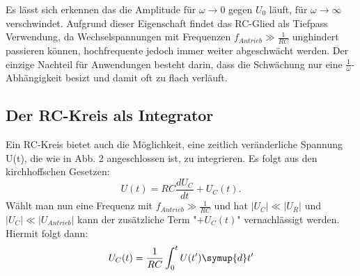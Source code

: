 Es lässt sich erkennen das die Amplitude für $\omega \to 0$ gegen $U_0$ läuft, für
$\omega \to \infty$ verschwindet. Aufgrund dieser Eigenschaft findet das RC-Glied als
 Tiefpass Verwendung, da Wechselspannungen mit Frequenzen $f_{Antrieb} \gg \frac{1}{RC}$
  unghindert passieren können, hochfrequente jedoch immer weiter abgeschwächt werden.
  Der einzige Nachteil für Anwendungen besteht darin, dass die Schwächung nur eine $\frac{1}{\omega}$-Abhängigkeit besizt und damit oft zu flach verläuft.

\subsection{Der RC-Kreis als Integrator}

Ein RC-Kreis bietet auch die Möglichkeit, eine zeitlich veränderliche Spannung U(t), die
wie in Abb. 2 angeschlossen ist, zu integrieren. Es folgt aus den kirchhoffschen Gesetzen:
\begin{equation}
  U(t) = RC\frac{dU_C}{dt}+U_C(t)\text{.}
\end{equation}
Wählt man nun eine Frequenz mit $f_{Antrieb} \gg \frac{1}{RC}$ und hat
$|U_C| \ll |U_R|$ und $|U_C| \ll |U_{Antrieb}|$ kann der zusätzliche Term "$+ U_C(t)$"
 vernachlässigt werden. Hiermit folgt dann:
\begin{equation}
U_C(t) = \frac{1}{RC}\int_{0}^{t} U(t') \symup{d}t'
\end{equation}
